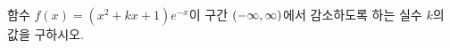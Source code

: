 함수 $f(x)=(x^2+kx+1)e^{-x}$이 구간 $(-\infty{,}\mkern3mu\mathopen{}\infty)$에서 감소하도록 하는 실수 $k$의 값을 구하시오.
